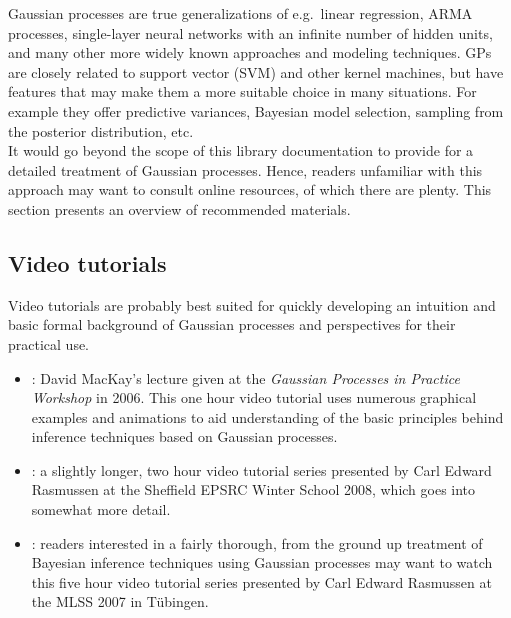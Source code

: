 \documentclass[10pt]{report}
\begin{document}
Gaussian processes are true generalizations of e.g.\ linear regression, ARMA
processes, single-layer neural networks with an infinite number of hidden
units, and many other more widely known approaches and modeling techniques.
GPs are closely related to support vector (SVM) and other kernel machines, but
have features that may make them a more suitable choice in many situations.
For example they offer predictive variances, Bayesian model selection,
sampling from the posterior distribution, etc.\\

It would go beyond the scope of this library documentation to provide for a
detailed treatment of Gaussian processes.  Hence, readers unfamiliar with this
approach may want to consult online resources, of which there are plenty.  This
section presents an overview of recommended materials.

\subsection{Video tutorials}

Video tutorials are probably best suited for quickly developing an intuition and
basic formal background of Gaussian processes and perspectives for their
practical use.

\begin{itemize}

\item \emph{}: David MacKay's lecture given at the \emph{Gaussian Processes
in Practice Workshop} in 2006.  This one hour video tutorial uses numerous
graphical examples and animations to aid understanding of the basic principles
behind inference techniques based on Gaussian processes.

\item
\emph{}: a slightly longer, two hour video tutorial series
presented by Carl Edward Rasmussen at the Sheffield EPSRC Winter School 2008,
which goes into somewhat more detail.

\item
\emph{}: readers interested in a fairly thorough,
from the ground up treatment of Bayesian inference techniques using Gaussian
processes may want to watch this five hour video tutorial series presented by
Carl Edward Rasmussen at the MLSS 2007 in T\"ubingen.

\end{itemize}
\end{document}
